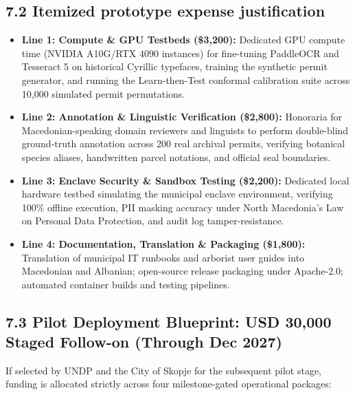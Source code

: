 \documentclass[9pt,a4paper]{article}
\begin{document}
\vspace{0.2em}
\subsection*{7.2 Itemized prototype expense justification}
\begin{itemize}[leftmargin=1.4em, itemsep=0.03em]
  \item \textbf{Line 1: Compute \& GPU Testbeds (\$3,200):} Dedicated GPU compute time (NVIDIA A10G/RTX 4090 instances) for fine-tuning PaddleOCR and Tesseract 5 on historical Cyrillic typefaces, training the synthetic permit generator, and running the Learn-then-Test conformal calibration suite across 10,000 simulated permit permutations.
  \item \textbf{Line 2: Annotation \& Linguistic Verification (\$2,800):} Honoraria for Macedonian-speaking domain reviewers and linguists to perform double-blind ground-truth annotation across 200 real archival permits, verifying botanical species aliases, handwritten parcel notations, and official seal boundaries.
  \item \textbf{Line 3: Enclave Security \& Sandbox Testing (\$2,200):} Dedicated local hardware testbed simulating the municipal enclave environment, verifying 100\% offline execution, PII masking accuracy under North Macedonia's Law on Personal Data Protection, and audit log tamper-resistance.
  \item \textbf{Line 4: Documentation, Translation \& Packaging (\$1,800):} Translation of municipal IT runbooks and arborist user guides into Macedonian and Albanian; open-source release packaging under Apache-2.0; automated container builds and testing pipelines.
\end{itemize}

\clearpage

\subsection*{7.3 Pilot Deployment Blueprint: USD 30,000 Staged Follow-on (Through Dec 2027)}
If selected by UNDP and the City of Skopje for the subsequent pilot stage, funding is allocated strictly across four milestone-gated operational packages:
\end{document}
